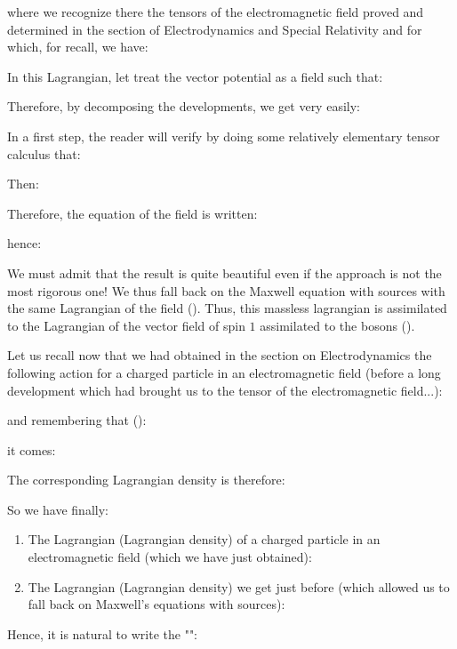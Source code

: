 	where we recognize there the tensors of the electromagnetic field proved and determined in the section of Electrodynamics and Special Relativity and for which, for recall, we have:
	
	In this Lagrangian, let treat the vector potential as a field such that:
	
	Therefore, by decomposing the developments, we get very easily:
	
	In a first step, the reader will verify by doing some relatively elementary tensor calculus that:
	
	Then:
	
	Therefore, the equation of the field is written:
	
	hence:
	
	We must admit that the result is quite beautiful even if the approach is not the most rigorous one! We thus fall back on the Maxwell equation with sources with the same Lagrangian of the field (). Thus, this massless lagrangian is assimilated to the Lagrangian of the vector field of spin $1$ assimilated to the bosons ().

	Let us recall now that we had obtained in the section on Electrodynamics the following action for a charged particle in an electromagnetic field (before a long development which had brought us to the tensor of the electromagnetic field...):
	
	and remembering that ():
	
	it comes:
	
	The corresponding Lagrangian density is therefore:
	
	So we have finally:
	\begin{enumerate}
		\item The Lagrangian (Lagrangian density) of a charged particle in an electromagnetic field (which we have just obtained):
		
		\item The Lagrangian (Lagrangian density) we get just before (which allowed us to fall back on Maxwell's equations with sources):
		
	\end{enumerate}	
	Hence, it is natural to write the "":
	
